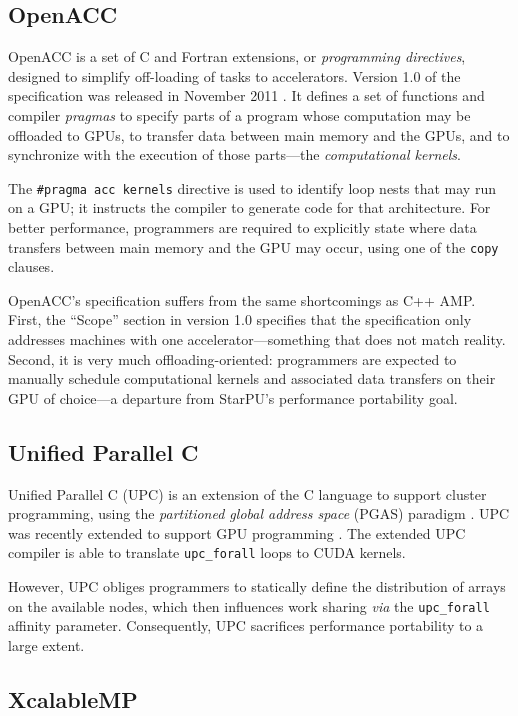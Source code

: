 \documentclass[twoside, a4paper, 10pt]{article}
\begin{document}
\subsection{OpenACC}
\label{sec-4-4}


OpenACC is a set of C and Fortran extensions, or \emph{programming directives}, designed to simplify off-loading of tasks to accelerators.
Version 1.0 of the specification was released in November 2011
\cite{openacc1.0:2012}.  It defines a set of functions and compiler
\emph{pragmas} to specify parts of a program whose computation may be
offloaded to GPUs, to transfer data between main memory and the GPUs,
and to synchronize with the execution of those parts---the \emph{computational kernels}.

The \texttt{\#pragma acc kernels} directive is used to identify loop nests that
may run on a GPU; it instructs the compiler to generate code for that
architecture.  For better performance, programmers are required to
explicitly state where data transfers between main memory and the GPU
may occur, using one of the \texttt{copy} clauses.

OpenACC's specification suffers from the same shortcomings as C++ AMP.
First, the ``Scope'' section in version 1.0 specifies that the
specification only addresses machines with one accelerator---something
that does not match reality.  Second, it is very much
offloading-oriented: programmers are expected to manually schedule
computational kernels and associated data transfers on their GPU of
choice---a departure from StarPU's performance portability goal.
\subsection{Unified Parallel C}
\label{sec-4-5}


Unified Parallel C (UPC) is an extension of the C language to support
cluster programming, using the \emph{partitioned global address space} (PGAS)
paradigm \cite{upc1.2-2005}.  UPC was recently extended to support GPU
programming \cite{Chen:2010:UPC:1964536.1964547}.  The extended UPC
compiler is able to translate \texttt{upc\_forall} loops to CUDA kernels.

However, UPC obliges programmers to statically define the distribution
of arrays on the available nodes, which then influences work sharing
\emph{via} the \texttt{upc\_forall} affinity parameter.  Consequently, UPC sacrifices
performance portability to a large extent.
\subsection{XcalableMP}
\label{sec-4-6}
\end{document}
